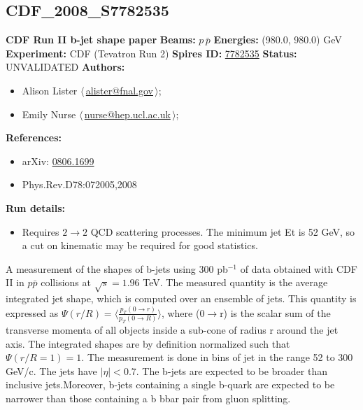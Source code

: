 \clearpage


\clearpage

\subsection[CDF\_2008\_S7782535]{CDF\_2008\_S7782535\,\cite{Aaltonen:2008de}}
\textbf{CDF Run II b-jet shape paper}\newline
\textbf{Beams:} $p$\,$\bar{p}$ \newline
\textbf{Energies:} (980.0, 980.0) GeV \newline
\textbf{Experiment:} CDF (Tevatron Run 2) \newline
\textbf{Spires ID:} \href{http://www.slac.stanford.edu/spires/find/hep/www?rawcmd=key+7782535}{7782535}\newline
\textbf{Status:} UNVALIDATED\newline
\textbf{Authors:}
\begin{itemize}
  \item Alison Lister $\langle\,$\href{mailto:alister@fnal.gov}{alister@fnal.gov}$\,\rangle$;
  \item Emily Nurse $\langle\,$\href{mailto:nurse@hep.ucl.ac.uk}{nurse@hep.ucl.ac.uk}$\,\rangle$;
\end{itemize}
\textbf{References:}
\begin{itemize}
  \item arXiv: \href{http://arxiv.org/abs/0806.1699}{0806.1699}
  \item Phys.Rev.D78:072005,2008
\end{itemize}
\textbf{Run details:}
\begin{itemize}

  \item Requires  $2\rightarrow{2}$ QCD scattering processes. The minimum jet Et is 52 GeV, so a cut on kinematic \pTmin may be required for good statistics.\end{itemize}

\noindent A measurement of the shapes of b-jets using 300 pb$^{-1}$ of data obtained with CDF II in $p\bar{p}$ collisions at $\sqrt{s}=1.96$ TeV. The measured quantity is the average integrated jet shape, which is computed over an ensemble of jets. This quantity is expressed as $\Psi(r/R) = \langle\frac{p_T(0 \rightarrow r)}{p_T(0 \rightarrow R)}\rangle$, where \pT (0$\rightarrow$r) is the scalar sum of the transverse momenta of all objects inside a sub-cone of radius r around the jet axis. The integrated shapes are by definition normalized such that  $\Psi(r/R =1) = 1$.   The measurement is done in bins of jet \pT in the range 52 to 300 GeV/c. The jets have $|\eta| < 0.7$. The b-jets are expected to be broader than inclusive jets.Moreover, b-jets containing a single b-quark are expected to be narrower than those containing a b bbar pair from gluon splitting.

